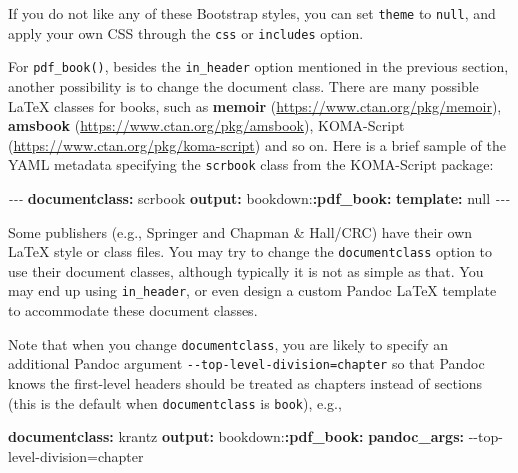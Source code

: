 \documentclass[
  12pt,
]{krantz}
\newenvironment{Shaded}{\begin{snugshade}}{\end{snugshade}}
\newcommand{\AttributeTok}[1]{\textcolor[rgb]{0.13,0.29,0.53}{#1}}
\newcommand{\CharTok}[1]{\textcolor[rgb]{0.31,0.60,0.02}{#1}}
\newcommand{\FunctionTok}[1]{\textcolor[rgb]{0.13,0.29,0.53}{\textbf{#1}}}
\newcommand{\KeywordTok}[1]{\textcolor[rgb]{0.13,0.29,0.53}{\textbf{#1}}}
\newcommand{\PreprocessorTok}[1]{\textcolor[rgb]{0.56,0.35,0.01}{\textit{#1}}}
\theoremstyle{definition}
\theoremstyle{definition}
\theoremstyle{definition}
\theoremstyle{definition}
\theoremstyle{remark}
\begin{document}
If you do not like any of these Bootstrap styles, you can set \texttt{theme} to \texttt{null}, and apply your own CSS through the \texttt{css} or \texttt{includes} option.

For \texttt{pdf\_book()}, besides the \texttt{in\_header} option mentioned in the previous section, another possibility is to change the document class. There are many possible LaTeX classes for books, such as \textbf{memoir} (\url{https://www.ctan.org/pkg/memoir}), \textbf{amsbook} (\url{https://www.ctan.org/pkg/amsbook}), KOMA-Script (\url{https://www.ctan.org/pkg/koma-script}) and so on. Here is a brief sample of the YAML metadata specifying the \texttt{scrbook} class from the KOMA-Script package:

\begin{Shaded}
\begin{Highlighting}[]
\PreprocessorTok{{-}{-}{-}}
\FunctionTok{documentclass}\KeywordTok{:}\AttributeTok{ scrbook}
\FunctionTok{output}\KeywordTok{:}
\AttributeTok{  bookdown:}\FunctionTok{:pdf\_book}\KeywordTok{:}
\AttributeTok{    }\FunctionTok{template}\KeywordTok{:}\AttributeTok{ }\CharTok{null}
\PreprocessorTok{{-}{-}{-}}
\end{Highlighting}
\end{Shaded}

Some publishers (e.g., Springer and Chapman \& Hall/CRC) have their own LaTeX style or class files. You may try to change the \texttt{documentclass} option to use their document classes, although typically it is not as simple as that. You may end up using \texttt{in\_header}, or even design a custom Pandoc LaTeX template to accommodate these document classes.

Note that when you change \texttt{documentclass}, you are likely to specify an additional Pandoc argument \texttt{-\/-top-level-division=chapter} so that Pandoc knows the first-level headers should be treated as chapters instead of sections (this is the default when \texttt{documentclass} is \texttt{book}), e.g.,

\begin{Shaded}
\begin{Highlighting}[]
\FunctionTok{documentclass}\KeywordTok{:}\AttributeTok{ krantz}
\FunctionTok{output}\KeywordTok{:}
\AttributeTok{  bookdown:}\FunctionTok{:pdf\_book}\KeywordTok{:}
\AttributeTok{    }\FunctionTok{pandoc\_args}\KeywordTok{:}\AttributeTok{ {-}{-}top{-}level{-}division=chapter}
\end{Highlighting}
\end{Shaded}
\end{document}

